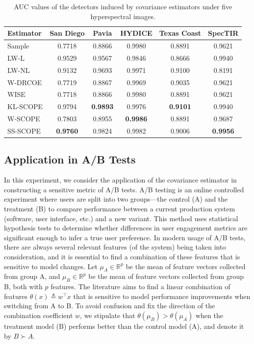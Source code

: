 \documentclass[11pt]{article}
\def\R{\mathbb{R}}
\newcommand{\Let}{\triangleq}
\def\transpose{\top}
\def\R{\mathbb{R}}
\begin{document}
\begin{table}[H]
\centering
\begin{tabular}{lccccc}
\hline
Estimator & San Diego & Pavia & HYDICE & Texas Coast & SpecTIR \\ \hline
Sample & 0.7718 & 0.8866 & 0.9980 & 0.8891 & 0.9621 \\ 
LW-L & 0.9529 & 0.9567 & 0.9846 & 0.8666 & 0.9940 \\ 
LW-NL & 0.9132 & 0.9693 & 0.9971 & 0.9100 & 0.8191 \\ 
W-DRCOE &0.7719  &0.8867  &0.9969  &0.9035 &0.9621 \\ 
WISE &0.7718 &0.8866  &0.9980  &0.8891 &0.9621 \\ 
KL-SCOPE & 0.9794 & \textbf{0.9893} & 0.9976 & \textbf{0.9101} & 0.9940 \\ 
W-SCOPE & {0.7803} & {0.8955} & \textbf{0.9986} & {0.8891} & 0.9687 \\ 
SS-SCOPE & \textbf{0.9760} & 0.9824 & {0.9982} & 0.9006 & \textbf{0.9956} \\ \hline
\end{tabular}
\caption{AUC values of the detectors induced by covariance estimators under five hyperspectral images.}\label{tab:anomaly-detection-AUC}
\end{table}

\subsection{Application in A/B Tests}

In this experiment, we consider the application of the covariance estimator in constructing a sensitive metric of A/B tests. A/B testing is an online controlled experiment where users are split into two groups—the control (A) and the treatment (B)  to compare performance between a current production system (software, user interface, etc.) and a new variant. This method uses statistical hypothesis tests to determine whether differences in user engagement metrics are significant enough to infer a true user preference. In modern usage of A/B tests, there are always several relevant features (of the system) being taken into consideration, and it is essential to find a combination of these features that is sensitive to model changes. Let $\mu_A\in \R^p$ be the mean of feature vectors collected from group A, and $\mu_B\in \R^p$ be the mean of feature vectors collected from group B, both with $p$ features. The literature aims to find a linear combination of features $\theta(x)\Let w^\transpose x$ that is sensitive to model performance improvements when switching from A to B. To avoid confusion and fix the direction of the combination coefficient $w$, we stipulate that $\theta(\mu_B) > \theta(\mu_A)$ when the treatment model (B) performs better than the control model (A), and denote it by $B\succ A$.
\end{document}
